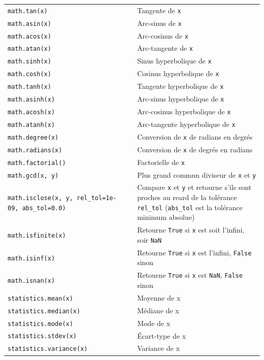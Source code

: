 \documentclass[
  12pt,
]{book}
\numberwithin{equation}{section}
\numberwithin{countremarque}{section}
\begin{document}
\begin{longtable}[]{@{}
  >{\raggedleft\arraybackslash}p{}
  >{\raggedleft\arraybackslash}p{}@{}}
\texttt{math.tan(x)} & Tangente de \texttt{x} \\
\texttt{math.asin(x)} & Arc-sinus de \texttt{x} \\
\texttt{math.acos(x)} & Arc-cosinus de \texttt{x} \\
\texttt{math.atan(x)} & Arc-tangente de \texttt{x} \\
\texttt{math.sinh(x)} & Sinus hyperbolique de \texttt{x} \\
\texttt{math.cosh(x)} & Cosinus hyperbolique de \texttt{x} \\
\texttt{math.tanh(x)} & Tangente hyperbolique de \texttt{x} \\
\texttt{math.asinh(x)} & Arc-sinus hyperbolique de \texttt{x} \\
\texttt{math.acosh(x)} & Arc-cosinus hyperbolique de \texttt{x} \\
\texttt{math.atanh(x)} & Arc-tangente hyperbolique de \texttt{x} \\
\texttt{math.degree(x)} & Conversion de \texttt{x} de radians en degrés \\
\texttt{math.radians(x)} & Conversion de \texttt{x} de degrés en radians \\
\texttt{math.factorial()} & Factorielle de \texttt{x} \\
\texttt{math.gcd(x,\ y)} & Plus grand commun diviseur de \texttt{x} et \texttt{y} \\
\texttt{math.isclose(x,\ y,\ rel\_tol=1e-09,\ abs\_tol=0.0)} & Compare \texttt{x} et \texttt{y} et retourne s'ils sont proches au reard de la tolérance \texttt{rel\_tol} (\texttt{abs\_tol} est la tolérance minimum absolue) \\
\texttt{math.isfinite(x)} & Retourne \texttt{True} si \texttt{x} est soit l'infini, soir \texttt{NaN} \\
\texttt{math.isinf(x)} & Retourne \texttt{True} si \texttt{x} est l'infini, \texttt{False} sinon \\
\texttt{math.isnan(x)} & Retourne \texttt{True} si \texttt{x} est \texttt{NaN}, \texttt{False} sinon \\
\texttt{statistics.mean(x)} & Moyenne de x \\
\texttt{statistics.median(x)} & Médiane de x \\
\texttt{statistics.mode(x)} & Mode de x \\
\texttt{statistics.stdev(x)} & Écart-type de x \\
\texttt{statistics.variance(x)} & Variance de x \\
\end{longtable}
\end{document}
